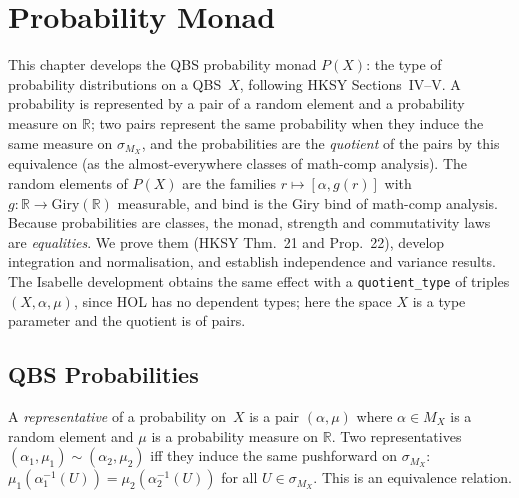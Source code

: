 \chapter{Probability Monad}\label{ch:probability}

This chapter develops the QBS probability monad $P(X)$: the type of
probability distributions on a QBS~$X$, following HKSY Sections~IV--V.
A probability is represented by a pair of a random element and a
probability measure on $\mathbb{R}$; two pairs represent the same
probability when they induce the same measure on $\sigma_{M_X}$, and the
probabilities are the \emph{quotient} of the pairs by this equivalence
(as the almost-everywhere classes of math-comp analysis). The random
elements of $P(X)$ are the families $r \mapsto [\alpha, g(r)]$ with
$g : \mathbb{R} \to \mathrm{Giry}(\mathbb{R})$ measurable, and bind is the
Giry bind of math-comp analysis.
Because probabilities are classes, the monad, strength and commutativity
laws are \emph{equalities}.
We prove them (HKSY Thm.~21 and Prop.~22), develop integration and
normalisation, and establish independence and variance results.
The Isabelle development obtains the same effect with a
\texttt{quotient\_type} of triples $(X, \alpha, \mu)$, since HOL has no
dependent types; here the space $X$ is a type parameter and the quotient
is of pairs.

\section{QBS Probabilities}\label{sec:prob_pair}

\begin{definition}\label{def:preprob_equiv}
  \rocqok
  A \emph{representative} of a probability on~$X$ is a pair
  $(\alpha, \mu)$ where $\alpha \in M_X$ is a random element and $\mu$ is a
  probability measure on $\mathbb{R}$. Two representatives
  $(\alpha_1, \mu_1) \sim (\alpha_2, \mu_2)$ iff they
  induce the same pushforward on $\sigma_{M_X}$:
  $\mu_1(\alpha_1^{-1}(U)) = \mu_2(\alpha_2^{-1}(U))$ for all
  $U \in \sigma_{M_X}$. This is an equivalence relation.
\end{definition}

